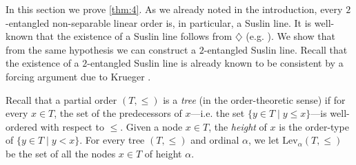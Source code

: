 \documentclass[12pt]{amsart}
\theoremstyle{definition}
\theoremstyle{remark}
\begin{document}
In this section we prove \cref{thm:4}. As we already noted in the introduction, every $2$-entangled non-separable linear order is, in particular, a Suslin line. It is well-known that the existence of a Suslin line follows from $\diamondsuit$ (e.g. \cite{MR756630,Devlin:1984aa}). We show that from the same hypothesis we can construct a $2$-entangled Suslin line. Recall that the existence of a $2$-entangled Suslin line is already known to be consistent by a forcing argument due to Krueger \cite{MR4080091}.

Recall that a partial order $(T, \le)$ is a \emph{tree} (in the order-theoretic sense) if for every $x \in T$, the set of the predecessors of $x$---i.e. the set $\{y \in T \mid y \le x\}$---is well-ordered with respect to $\le$. Given a node $x \in T$, the \emph{height} of $x$ is the order-type of $\{y \in T \mid y < x\} $. For every tree $(T, \le)$ and ordinal $\alpha$, we let  $\mathrm{Lev}_\alpha(T, \le)$ be the set of all the nodes $x \in T$ of height $\alpha$.
\end{document}
